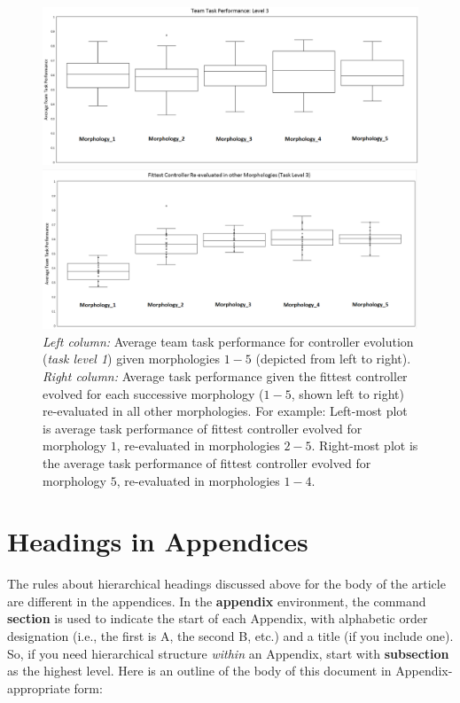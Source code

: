 \begin{figure}[t]
	\begin{minipage}{0.5\textwidth}
		\includegraphics[width=\textwidth]{Evo_BoxPlot_Level3.eps}
	\end{minipage}
	\begin{minipage}{0.5\textwidth}
		\includegraphics[width=\textwidth]{Level3_ReEval.eps}
	\end{minipage}
	\caption{\textit{Left column:} Average team task performance for controller evolution (\textit{task level 1})
		given morphologies $1-5$ (depicted from left to right).
		\textit{Right column:} Average task performance given the fittest controller evolved
		for each successive morphology ($1-5$, shown left to right) re-evaluated in all other morphologies.
		For example: Left-most plot is average task performance of fittest controller evolved for
		morphology $1$, re-evaluated in morphologies $2-5$.  Right-most plot is the average task performance
		of fittest controller evolved for morphology $5$, re-evaluated in morphologies $1-4$.}\label{fig:level3results}
\end{figure}

\appendix
\section{Headings in Appendices}
The rules about hierarchical headings discussed above for
the body of the article are different in the appendices.
In the \textbf{appendix} environment, the command
\textbf{section} is used to
indicate the start of each Appendix, with alphabetic order
designation (i.e., the first is A, the second B, etc.) and
a title (if you include one).  So, if you need
hierarchical structure
\textit{within} an Appendix, start with \textbf{subsection} as the
highest level. Here is an outline of the body of this
document in Appendix-appropriate form:
